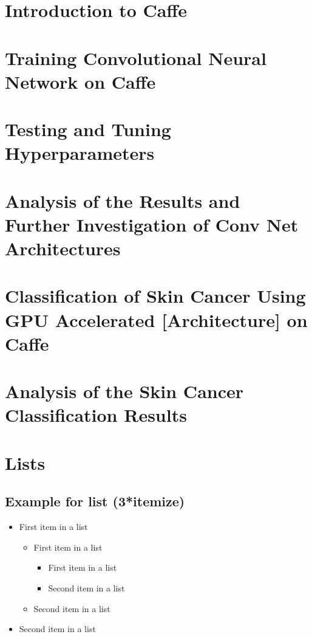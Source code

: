 \documentclass[paper=a4, fontsize=11pt]{scrartcl}
\numberwithin{equation}{section}		%
\numberwithin{figure}{section}			%
\numberwithin{table}{section}			%
\begin{document}
	\section{Introduction to Caffe}
	\section{Training Convolutional Neural Network on Caffe}
	\section{Testing and Tuning Hyperparameters}
	\section{Analysis of the Results and Further Investigation of Conv Net Architectures}
	\section{Classification of Skin Cancer Using GPU Accelerated [Architecture] on Caffe}
	\section{Analysis of the Skin Cancer Classification Results}
	
	
	\section{Lists}
	
	\subsection{Example for list (3*itemize)}
	\begin{itemize}
		\item First item in a list 
		\begin{itemize}
			\item First item in a list 
			\begin{itemize}
				\item First item in a list 
				\item Second item in a list 
			\end{itemize}
			\item Second item in a list 
		\end{itemize}
		\item Second item in a list 
	\end{itemize}
	
\end{document}
